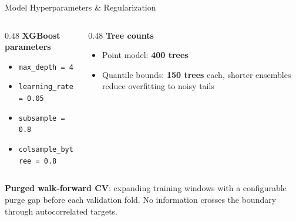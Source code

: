 \documentclass[aspectratio=169]{beamer}
\begin{document}
\begin{frame}{Model Hyperparameters \& Regularization}
\begin{columns}[T]
\begin{column}{0.48\textwidth}
\textbf{XGBoost parameters}
\begin{itemize}
    \item \texttt{max\_depth = 4}
    \item \texttt{learning\_rate = 0.05}
    \item \texttt{subsample = 0.8}
    \item \texttt{colsample\_bytree = 0.8}
\end{itemize}
\end{column}
\begin{column}{0.48\textwidth}
\textbf{Tree counts}
\begin{itemize}
    \item Point model: \textbf{400 trees}
    \item Quantile bounds: \textbf{150 trees} each, shorter ensembles reduce overfitting to noisy tails
\end{itemize}
\end{column}
\end{columns}
\vspace{0.3cm}
\textbf{Purged walk-forward CV}: expanding training windows with a configurable purge gap before each validation fold. No information crosses the boundary through autocorrelated targets.
\end{frame}
\end{document}
